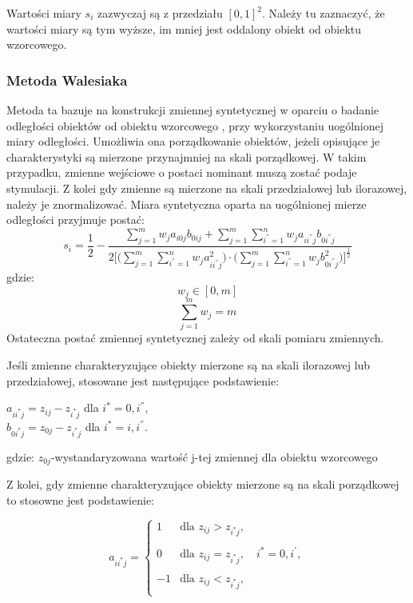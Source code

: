 \documentclass[12pt,a4paper]{report}
\begin{document}
Wartości miary $s_{i}$ zazwyczaj są z przedziału $[0, 1]^2$. Należy tu zaznaczyć, że wartości miary są tym wyższe, im mniej jest oddalony obiekt od obiektu wzorcowego. 

\subsubsection{Metoda Walesiaka}
\noindent


Metoda ta bazuje na konstrukcji zmiennej syntetycznej w oparciu o badanie odległości obiektów od obiektu wzorcowego , przy wykorzystaniu uogólnionej miary odległości. Umożliwia ona  porządkowanie obiektów, jeżeli opisujące je charakterystyki są mierzone przynajmniej na skali porządkowej. W takim przypadku, zmienne wejściowe o postaci nominant muszą zostać podaje stymulacji. Z kolei gdy zmienne są mierzone na skali przedziałowej lub ilorazowej, należy je znormalizować. 
Miara syntetyczna oparta na uogólnionej mierze odległości przyjmuje postać:
\begin{equation}
s_i=\frac{1}{2}-\frac{\sum_{j=1}^{m} w_{j}a_{i0j}b_{0ij} + \sum_{j=1}^{m}\sum_{i^{''}=1}^{n} w_{j}a_{ii^{''}j}b_{0i^{''}j}}{2\bigg[\bigg(\sum_{j=1}^{m}\sum_{i^{''}=1}^{n} w_{j}a^{2}_{ii^{''}j} \bigg)\cdot \bigg(\sum_{j=1}^{m}\sum_{i^{''}=1}^{n} w_{j}b^{2}_{0i^{''}j}\bigg) \bigg]^{\frac{1}{2} }}
\end{equation}
gdzie:
$$w_{j} \in [0, m]$$
$$\sum_{j=1}^{m} w_{j}=m$$
\newline
Ostateczna postać zmiennej syntetycznej zależy od skali pomiaru zmiennych. 

Jeśli zmienne charakteryzujące obiekty mierzone są na skali ilorazowej lub przedziałowej, stosowane jest następujące podstawienie:
\begin{center}
$a_{ii^{*}j}=z_{ij} - z_{i^{*}j}$ dla $i^{*}=0,i^{''},$\\
$b_{0i^{*}j}=z_{0j}-z_{i^*j}$ dla $i^{*}=i,i^{''}$.
\end{center}
gdzie:
\newline
$z_{0j}$-wystandaryzowana wartość j-tej zmiennej dla obiektu wzorcowego

Z kolei, gdy zmienne charakteryzujące obiekty mierzone są na skali porządkowej to stosowne jest podstawienie:

\begin{equation}
a_{ii^{*}j}=\left\{ \begin{array}{lll}
1  & \textrm{dla  } z_{ij}>z_{i^{*}j},\\\\
0 & \textrm{dla } z_{ij}=z_{i^{*}j}, \quad i^{*}=0,i^{'},\\\\
-1 & \textrm{dla } z_{ij}<z_{i^{*}j},\\
\end{array} \right.
\end{equation}
\end{document}
